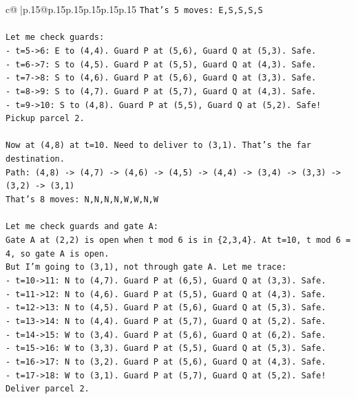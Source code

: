 \documentclass{article}
\begin{document}
{\begin{supertabular}{c@{$\;$}|p{.15\linewidth}@{}p{.15\linewidth}p{.15\linewidth}p{.15\linewidth}p{.15\linewidth}p{.15\linewidth}}
{{{\texttt{That's 5 moves: E,S,S,S,S} \\
\\ 
\texttt{Let me check guards:} \\
\texttt{{-} t=5{-}>6: E to (4,4). Guard P at (5,6), Guard Q at (5,3). Safe.} \\
\texttt{{-} t=6{-}>7: S to (4,5). Guard P at (5,5), Guard Q at (4,3). Safe.} \\
\texttt{{-} t=7{-}>8: S to (4,6). Guard P at (5,6), Guard Q at (3,3). Safe.} \\
\texttt{{-} t=8{-}>9: S to (4,7). Guard P at (5,7), Guard Q at (4,3). Safe.} \\
\texttt{{-} t=9{-}>10: S to (4,8). Guard P at (5,5), Guard Q at (5,2). Safe! Pickup parcel 2.} \\
\\ 
\texttt{Now at (4,8) at t=10. Need to deliver to (3,1). That's the far destination.} \\
\texttt{Path: (4,8) {-}> (4,7) {-}> (4,6) {-}> (4,5) {-}> (4,4) {-}> (3,4) {-}> (3,3) {-}> (3,2) {-}> (3,1)} \\
\texttt{That's 8 moves: N,N,N,N,W,W,N,W} \\
\\ 
\texttt{Let me check guards and gate A:} \\
\texttt{Gate A at (2,2) is open when t mod 6 is in \{2,3,4\}. At t=10, t mod 6 = 4, so gate A is open.} \\
\texttt{But I'm going to (3,1), not through gate A. Let me trace:} \\
\texttt{{-} t=10{-}>11: N to (4,7). Guard P at (6,5), Guard Q at (3,3). Safe.} \\
\texttt{{-} t=11{-}>12: N to (4,6). Guard P at (5,5), Guard Q at (4,3). Safe.} \\
\texttt{{-} t=12{-}>13: N to (4,5). Guard P at (5,6), Guard Q at (5,3). Safe.} \\
\texttt{{-} t=13{-}>14: N to (4,4). Guard P at (5,7), Guard Q at (5,2). Safe.} \\
\texttt{{-} t=14{-}>15: W to (3,4). Guard P at (5,6), Guard Q at (6,2). Safe.} \\
\texttt{{-} t=15{-}>16: W to (3,3). Guard P at (5,5), Guard Q at (5,3). Safe.} \\
\texttt{{-} t=16{-}>17: N to (3,2). Guard P at (5,6), Guard Q at (4,3). Safe.} \\
\texttt{{-} t=17{-}>18: W to (3,1). Guard P at (5,7), Guard Q at (5,2). Safe! Deliver parcel 2.} \\
}}}
\end{supertabular}}
\end{document}
